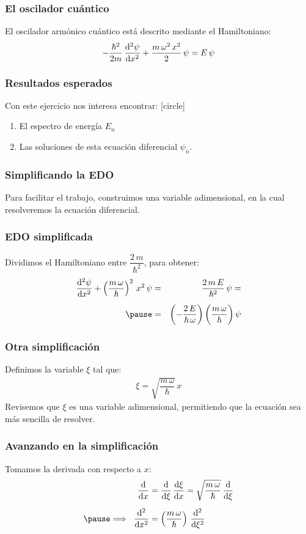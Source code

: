 \documentclass[12pt]{beamer}
\begin{document}
\begin{frame}
\frametitle{El oscilador cuántico}
El oscilador armónico cuántico está descrito mediante el Hamiltoniano:
\pause
\begin{align*}
- \dfrac{\hbar^{2}}{2 m} \, \dv[2]{\psi}{x} + \dfrac{m \, \omega^{2} \, x^{2}}{2} \, \psi = E \, \psi
\end{align*}
\end{frame}
\begin{frame}
\frametitle{Resultados esperados}
Con este ejercicio nos interesa encontrar:
[circle]
\begin{enumerate}[<+->]
\item El espectro de energía $E_{n}$
\item Las soluciones de esta ecuación diferencial $\psi_{n}$.
\end{enumerate}
\end{frame}
\begin{frame}
\frametitle{Simplificando la EDO}
Para facilitar el trabajo, construimos una variable adimensional, en la cual resolveremos la ecuación diferencial.
\end{frame}
\begin{frame}
\frametitle{EDO simplificada}
Dividimos el Hamiltoniano entre $\dfrac{2 \, m}{\hbar^{2}}$, para obtener:
\pause
\begin{eqnarray*}
\dv[2]{\psi}{x}  + \left( \dfrac{m \, \omega}{\hbar} \right)^{2} \, x^{2} \, \psi &=&  \dfrac{2 \, m \, E}{\hbar^{2}} \, \psi =  \\[0.5em] \pause
&=& \left( - \dfrac{2 \, E}{\hbar \, \omega} \right) \bigg( \dfrac{m \, \omega}{\hbar} \bigg) \, \psi
\end{eqnarray*}
\end{frame}
\begin{frame}
\frametitle{Otra simplificación}
Definimos la variable $\xi$ tal que:
\pause
\begin{align*}
\xi = \sqrt{\dfrac{m \, \omega}{\hbar}} \, x
\end{align*}
Revisemos que $\xi$ es una variable adimensional, permitiendo que la ecuación sea más sencilla de resolver.
\end{frame}
\begin{frame}
\frametitle{Avanzando en la simplificación}
Tomamos la derivada con respecto a $x$:
\pause
\begin{eqnarray*}
\begin{aligned}
\dv{x} &= \dv{\xi} \, \dv{\xi}{x} = \sqrt{\dfrac{m \, \omega}{\hbar}} \, \dv{\xi} \\[0.5em] \pause
\Longrightarrow \hspace{0.2cm} \dv[2]{x} &= \left( \dfrac{m \, \omega}{\hbar} \right) \, \dv[2]{\xi}
\end{aligned}
\end{eqnarray*}
\end{frame}
\end{document}
